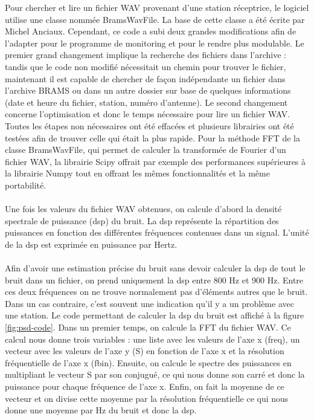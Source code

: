\documentclass[11pt]{article}
\begin{document}
Pour chercher et lire un fichier WAV provenant d'une station réceptrice, le logiciel utilise une classe nommée BramsWavFile.
La base de cette classe a été écrite par Michel Anciaux.
Cependant, ce code a subi deux grandes modifications afin de l'adapter pour le programme de monitoring et pour le rendre plus modulable.
Le premier grand changement implique la recherche des fichiers dans l'archive : tandis que le code non modifié nécessitait un chemin pour trouver le fichier, maintenant il est capable de chercher de façon indépendante un fichier dans l'archive BRAMS ou dans un autre dossier sur base de quelques informations (date et heure du fichier, station, numéro d'antenne).
Le second changement concerne l'optimisation et donc le temps nécessaire pour lire un fichier WAV.
Toutes les étapes non nécessaires ont été effacées et plusieurs librairies ont été testées afin de trouver celle qui était la plus rapide.
Pour la méthode FFT de la classe BramsWavFile, qui permet de calculer la transformée de Fourier d'un fichier WAV, la librairie Scipy offrait par exemple des performances supérieures à la librairie Numpy tout en offrant les mêmes fonctionnalités et la même portabilité.\\
\\
Une fois les valeurs du fichier WAV obtenues, on calcule d'abord la densité spectrale de puissance (dsp) du bruit.
La dsp représente la répartition des puissances en fonction des différentes fréquences contenues dans un signal.
L'unité de la dsp est exprimée en puissance par Hertz.\\
\\
Afin d'avoir une estimation précise du bruit sans devoir calculer la dsp de tout le bruit dans un fichier, on prend uniquement la dsp entre 800 Hz et 900 Hz.
Entre ces deux fréquences on ne trouve normalement pas d'éléments autres que le bruit.
Dans un cas contraire, c'est souvent une indication qu'il y a un problème avec une station.
Le code permettant de calculer la dsp du bruit est affiché à la figure \ref{fig:psd-code}.
Dans un premier temps, on calcule la FFT du fichier WAV.
Ce calcul nous donne trois variables : une liste avec les valeurs de l'axe x (freq), un vecteur avec les valeurs de l'axe y (S) en fonction de l'axe x et la résolution fréquentielle de l'axe x (fbin).
Ensuite, on calcule le spectre des puissances en multipliant le vecteur S par son conjugué, ce qui nous donne son carré et donc la puissance pour chaque fréquence de l'axe x.
Enfin, on fait la moyenne de ce vecteur et on divise cette moyenne par la résolution fréquentielle ce qui nous donne une moyenne par Hz du bruit et donc la dsp.\\
\end{document}
